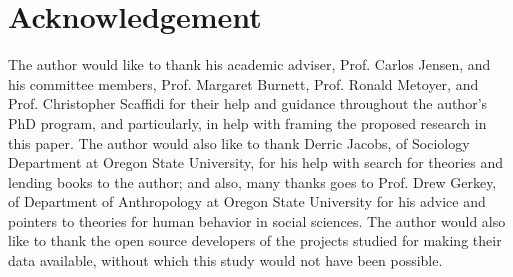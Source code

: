 \documentclass{acm_proc_article-sp}
\begin{document}
\section*{Acknowledgement}
\label{acknowledgements}
The author would like to thank his academic adviser, Prof. Carlos Jensen, and his committee members, Prof. Margaret Burnett, Prof. Ronald Metoyer, and Prof. Christopher Scaffidi for their help and guidance throughout the author's PhD program, and particularly, in help with framing the proposed research in this paper. The author would also like to thank Derric Jacobs, of Sociology Department at Oregon State University, for his help with search for theories and lending books to the author; and also, many thanks goes to Prof. Drew Gerkey, of Department of Anthropology at Oregon State University for his advice and pointers to theories for human behavior in social sciences.
The author would also like to thank the open source developers of the projects studied for making their data available, without which this study would not have been possible. \\

%


  

%
%
\end{document}
